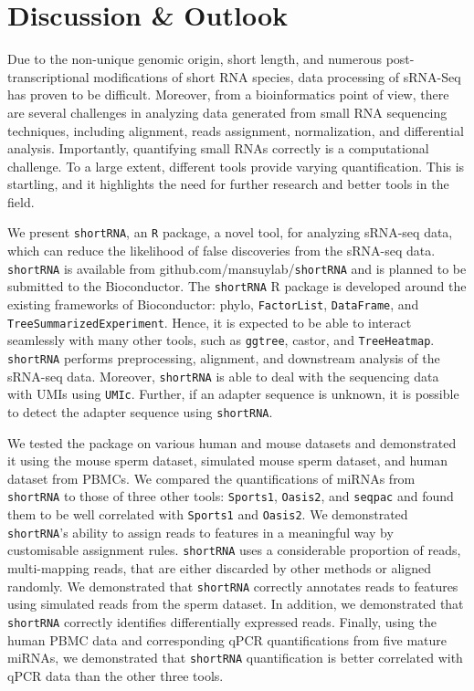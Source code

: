 \documentclass[12pt,twoside]{reedthesis}
\begin{document}
\hypertarget{discussion-outlook}{%
\section{Discussion \& Outlook}\label{discussion-outlook}}

Due to the non-unique genomic origin, short length, and numerous
post-transcriptional modifications of short RNA species, data processing
of sRNA-Seq has proven to be difficult. Moreover, from a bioinformatics
point of view, there are several challenges in analyzing data generated
from small RNA sequencing techniques, including alignment, reads
assignment, normalization, and differential analysis. Importantly,
quantifying small RNAs correctly is a computational challenge. To a
large extent, different tools provide varying quantification. This is
startling, and it highlights the need for further research and better
tools in the field.

We present \texttt{shortRNA}, an \texttt{R} package, a novel tool, for analyzing sRNA-seq
data, which can reduce the likelihood of false discoveries from the
sRNA-seq data. \texttt{shortRNA} is available from github.com/mansuylab/\texttt{shortRNA}
and is planned to be submitted to the Bioconductor. The \texttt{shortRNA} R
package is developed around the existing frameworks of Bioconductor:
phylo, \texttt{FactorList}, \texttt{DataFrame}, and \texttt{TreeSummarizedExperiment}. Hence, it is
expected to be able to interact seamlessly with many other tools, such
as \texttt{ggtree}, castor, and \texttt{TreeHeatmap}. \texttt{shortRNA} performs preprocessing,
alignment, and downstream analysis of the sRNA-seq data. Moreover,
\texttt{shortRNA} is able to deal with the sequencing data with UMIs using \texttt{UMIc}.
Further, if an adapter sequence is unknown, it is possible to detect the
adapter sequence using \texttt{shortRNA}.

We tested the package on various human and mouse datasets and
demonstrated it using the mouse sperm dataset, simulated mouse sperm
dataset, and human dataset from PBMCs. We compared the quantifications
of miRNAs from \texttt{shortRNA} to those of three other tools: \texttt{Sports1}, \texttt{Oasis2},
and \texttt{seqpac} and found them to be well correlated with \texttt{Sports1} and \texttt{Oasis2}.
We demonstrated \texttt{shortRNA}'s ability to assign reads to features in a
meaningful way by customisable assignment rules. \texttt{shortRNA} uses a
considerable proportion of reads, multi-mapping reads, that are either
discarded by other methods or aligned randomly. We demonstrated that
\texttt{shortRNA} correctly annotates reads to features using simulated reads
from the sperm dataset. In addition, we demonstrated that \texttt{shortRNA}
correctly identifies differentially expressed reads. Finally, using the
human PBMC data and corresponding qPCR quantifications from five mature
miRNAs, we demonstrated that \texttt{shortRNA} quantification is better
correlated with qPCR data than the other three tools.
\end{document}
